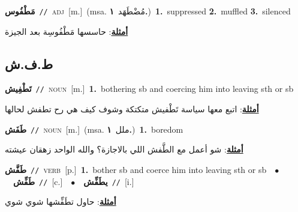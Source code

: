 \documentclass[10pt,a4paper,twoside]{article} %
\begin{document}
\begin{multicols}{2}
{\setlength\topsep{0pt}\textbf{\foreignlanguage{arabic}{مَطْفُوس}}\ {\color{gray}\texttt{//}\color{black}}\ \textsc{adj}\ [m.]\ \color{gray}(msa. \foreignlanguage{arabic}{مُضْطَهَد}~\foreignlanguage{arabic}{\textbf{١.}})\color{black}\ \textbf{1.}~suppressed  \textbf{2.}~muffled  \textbf{3.}~silenced\  \begin{flushright}\color{gray}\foreignlanguage{arabic}{\textbf{\underline{\foreignlanguage{arabic}{أمثلة}}}: حاسسها مَطْفُوسِة بعد الجيزة}\end{flushright}\color{black}} \vspace{2mm}

\vspace{-3mm}
\subsection*{\color{blue}\foreignlanguage{arabic}{ط.ف.ش}\color{blue}{}} 

{\setlength\topsep{0pt}\textbf{\foreignlanguage{arabic}{تَطْفِيش}}\ {\color{gray}\texttt{//}\color{black}}\ \textsc{noun}\ [m.]\ \textbf{1.}~bothering sb and coercing him into leaving sth or sb\  \begin{flushright}\color{gray}\foreignlanguage{arabic}{\textbf{\underline{\foreignlanguage{arabic}{أمثلة}}}: اتبع معها سياسة تَطْفيش متكتكة وشوف كيف هي رح تطفش لحالها}\end{flushright}\color{black}} \vspace{2mm}

{\setlength\topsep{0pt}\textbf{\foreignlanguage{arabic}{طَفَش}}\ {\color{gray}\texttt{//}\color{black}}\ \textsc{noun}\ [m.]\ \color{gray}(msa. \foreignlanguage{arabic}{ملل}~\foreignlanguage{arabic}{\textbf{١.}})\color{black}\ \textbf{1.}~boredom\  \begin{flushright}\color{gray}\foreignlanguage{arabic}{\textbf{\underline{\foreignlanguage{arabic}{أمثلة}}}: شو أعمل مع الطَّفش اللي بالاجازة؟ والله الواحد زهقان عيشته}\end{flushright}\color{black}} \vspace{2mm}

{\setlength\topsep{0pt}\textbf{\foreignlanguage{arabic}{طَفَّش}}\ {\color{gray}\texttt{//}\color{black}}\ \textsc{verb}\ [p.]\ \textbf{1.}~bother sb and coerce him into leaving sth or sb\ \ $\bullet$\ \ \setlength\topsep{0pt}\textbf{\foreignlanguage{arabic}{طَفِّش}}\ {\color{gray}\texttt{//}\color{black}}\ [c.]\ \ $\bullet$\ \ \setlength\topsep{0pt}\textbf{\foreignlanguage{arabic}{يطَفِّش}}\ {\color{gray}\texttt{//}\color{black}}\ [i.]\  \begin{flushright}\color{gray}\foreignlanguage{arabic}{\textbf{\underline{\foreignlanguage{arabic}{أمثلة}}}: حاول تطَفِّشها شوي شوي}\end{flushright}\color{black}} \vspace{2mm}


\end{multicols}
\end{document}

